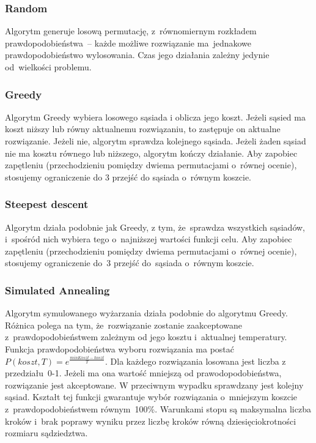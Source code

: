 \documentclass[a4paper,10pt]{article}
\begin{document}
\subsubsection{Random}
Algorytm generuje losową permutację, z~równomiernym rozkładem prawdopodobieństwa~-- każde możliwe rozwiązanie
ma~jednakowe prawdopodobieństwo wylosowania. 
Czas jego działania zależny jedynie od~wielkości problemu.


\subsubsection{Greedy}
Algorytm Greedy wybiera losowego sąsiada i oblicza jego koszt.
Jeżeli sąsied ma koszt niższy lub równy aktualnemu rozwiązaniu, to zastępuje on aktualne rozwiązanie.
Jeżeli nie, algorytm sprawdza kolejnego sąsiada.
Jeżeli żaden sąsiad nie ma kosztu równego lub niższego, algorytm kończy działanie.
Aby zapobiec zapętleniu (przechodzieniu pomiędzy dwiema permutacjami o~równej ocenie), stosujemy ograniczenie do 3 przejść do sąsiada o~równym koszcie.

\subsubsection{Steepest descent}
Algorytm działa podobnie jak Greedy, z tym, że~sprawdza wszystkich sąsiadów, i~spośród nich wybiera tego
o~najniższej wartości funkcji celu.
Aby zapobiec zapętleniu (przechodzieniu pomiędzy dwiema permutacjami o~równej ocenie),
stosujemy ograniczenie do~3 przejść do~sąsiada o~równym koszcie.

\subsubsection{Simulated Annealing}
Algorytm symulowanego wyżarzania działa podobnie do algorytmu Greedy.
Różnica polega na tym, że~rozwiązanie zostanie zaakceptowane z~prawdopodobieństwem zależnym od jego kosztu i~aktualnej temperatury.
Funkcja prawdopodobieństwa wyboru rozwiązania ma postać $P(koszt, T) = e^{\frac{minKoszt-koszt}{T}}$.
Dla każdego rozwiązania losowana jest liczba z przedziału~0-1.
Jeżeli ma ona wartość mniejszą od prawodopodobieństwa, rozwiązanie jest akceptowane.
W przeciwnym wypadku sprawdzany jest kolejny sąsiad.
Kształt tej funkcji gwarantuje wybór rozwiązania o~mniejszym koszcie z~prawdopodobieństwem równym~100\%.
Warunkami stopu są maksymalna liczba kroków i~brak poprawy wyniku przez liczbę kroków równą dziesięciokrotności rozmiaru sądziedztwa.
\end{document}
